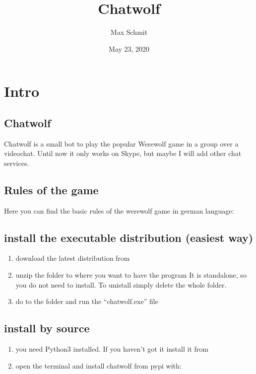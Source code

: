 \documentclass[letterpaper,10pt,english]{sphinxmanual}
\title{Chatwolf}
\date{May 23, 2020}
\author{Max Schmit}
\begin{document}
\pagestyle{empty}
\sphinxmaketitle
\pagestyle{plain}
\sphinxtableofcontents
\pagestyle{normal}
\label{\detokenize{index::doc}}



\chapter{Intro}
\label{\detokenize{intro:intro}}\label{\detokenize{intro::doc}}

\section{Chatwolf}
\label{\detokenize{data/Readme:chatwolf}}\label{\detokenize{data/Readme::doc}}
Chatwolf is a small bot to play the popular Werewolf game in a group over a videochat.
Until now it only works on Skype, but maybe I will add other chat services.


\section{Rules of the game}
\label{\detokenize{data/Readme:rules-of-the-game}}
Here you can find the basic rules of the werewolf game in german language:


\section{install the executable distribution (easiest way)}
\label{\detokenize{data/Readme:install-the-executable-distribution-easiest-way}}\begin{enumerate}
%
\item {} 
download the latest distribution from 

\item {} 
unzip the folder to where you want to have the program
It is standalone, so you do not need to install. To unistall simply delete the whole folder.

\item {} 
do to the folder and run the “chatwolf.exe” file

\end{enumerate}


\section{install by source}
\label{\detokenize{data/Readme:install-by-source}}\begin{enumerate}
%
\item {} 
you need Python3 installed.
If you haven’t got it install it from 

\item {} 
open the terminal and install chatwolf from pypi with:

\end{enumerate}
\end{document}
